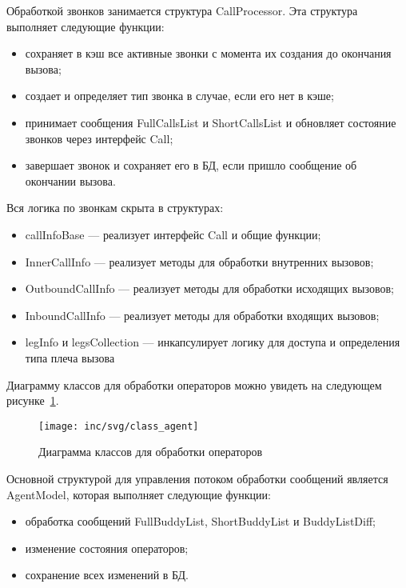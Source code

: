 Обработкой звонков занимается структура CallProcessor.
Эта структура выполняет следующие функции:
\begin{itemize}
    \item сохраняет в кэш все активные звонки с момента их создания до окончания вызова;
    \item создает и определяет тип звонка в случае, если его нет в кэше; %
    \item принимает сообщения FullCallsList и ShortCallsList и обновляет состояние звонков через интерфейс Call;
    \item завершает звонок и сохраняет его в БД, если пришло сообщение об окончании вызова.
\end{itemize}

Вся логика по звонкам скрыта в структурах:
\begin{itemize}
    \item callInfoBase --- реализует интерфейс Call и общие функции;
    \item InnerCallInfo --- реализует методы для обработки внутренних вызовов; %
    \item OutboundCallInfo --- реализует методы для обработки исходящих вызовов;
    \item InboundCallInfo --- реализует методы для обработки входящих вызовов;
    \item legInfo и legsCollection --- инкапсулирует логику для доступа и определения типа плеча вызова~%
\end{itemize}

Диаграмму классов для обработки операторов можно увидеть на следующем рисунке~\ref{pic:agent:uml-class}.

\begin{figure}[ht]
    \centering
    \texttt{[image: inc/svg/class\_agent]}
    \caption{Диаграмма классов для обработки операторов}
    \label{pic:agent:uml-class}
\end{figure}

Основной структурой для управления потоком обработки сообщений является AgentModel, которая выполняет следующие функции:
\begin{itemize}
    \item обработка сообщений FullBuddyList, ShortBuddyList и BuddyListDiff;
    \item изменение состояния операторов;
    \item сохранение всех изменений в БД.
\end{itemize}

